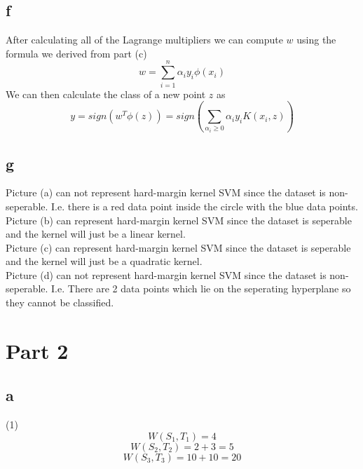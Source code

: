 \documentclass{article}
\begin{document}
\subsection{f}
After calculating all of the Lagrange multipliers we can compute $w$ using the
formula we derived from part (c)
\begin{equation*}
  w = \sum_{i=1}^{n}\alpha_i y_i \phi(x_i)
\end{equation*}
We can then calculate the class of a new point $z$ as
\begin{equation*}
  y = sign(w^T \phi(z)) = sign(\sum_{\alpha_i \ge 0}\alpha_i y_i K(x_i, z))
\end{equation*}

\subsection{g}
Picture (a) can not represent hard-margin kernel SVM since the
dataset is non-seperable. I.e. there is a red data point inside the circle
with the blue data points. \\
Picture (b) can represent hard-margin kernel SVM since the dataset is seperable
and the kernel will just be a linear kernel. \\
Picture (c) can represent hard-margin kernel SVM since the dataset is seperable
and the kernel will just be a quadratic kernel.\\
Picture (d) can not represent hard-margin kernel SVM since the dataset is
non-seperable. I.e. There are 2 data points which lie on the seperating
hyperplane so they cannot be classified.

\section{Part 2}

\subsection{a}
(1)
\begin{equation*}
  W(S_1, T_1) = 4
\end{equation*}
\begin{equation*}
  W(S_2, T_2) = 2 + 3 = 5
\end{equation*}
\begin{equation*}
  W(S_3, T_3) = 10 + 10 = 20
\end{equation*}
\end{document}
